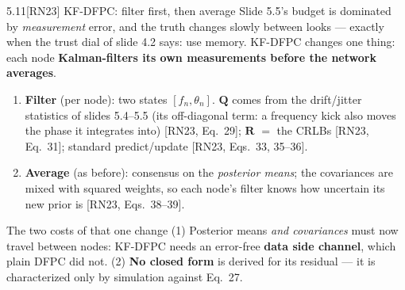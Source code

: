 \documentclass[10pt]{beamer}
\newcommand{\RN}[1]{\textcolor{blue!50!black}{[RN23#1]}}
\newcommand{\srcline}[1]{\par\vfill\noindent{\tiny\textcolor{gray}{Source: #1}}}
\begin{document}
\begin{frame}{5.11\quad \RN{} KF-DFPC: filter first, then average}
\small
Slide 5.5's budget is dominated by \emph{measurement} error, and the
truth changes slowly between looks --- exactly when the trust dial of
slide 4.2 says: use memory. KF-DFPC changes one thing: each node
\textbf{Kalman-filters its own measurements before the network
averages}.
\begin{enumerate}
\item \textbf{Filter} (per node): two states $[f_n,\theta_n]$.
$\mathbf Q$ comes from the drift/jitter statistics of slides 5.4--5.5
(its off-diagonal term: a frequency kick also moves the phase it
integrates into) \RN{, Eq.~29}; $\mathbf R$ $=$ the CRLBs \RN{,
Eq.~31}; standard predict/update \RN{, Eqs.~33, 35--36}.
\item \textbf{Average} (as before): consensus on the \emph{posterior
means}; the covariances are mixed with squared weights, so each
node's filter knows how uncertain its new prior is \RN{, Eqs.~38--39}.
\end{enumerate}
\begin{alertblock}{The two costs of that one change}
(1) Posterior means \emph{and covariances} must now travel between
nodes: KF-DFPC needs an error-free \textbf{data side channel}, which
plain DFPC did not. (2) \textbf{No closed form} is derived for its
residual --- it is characterized only by simulation against Eq.~27.
\end{alertblock}
\srcline{[RN23] \S IV, Algorithm 2.}
\end{frame}
\end{document}

